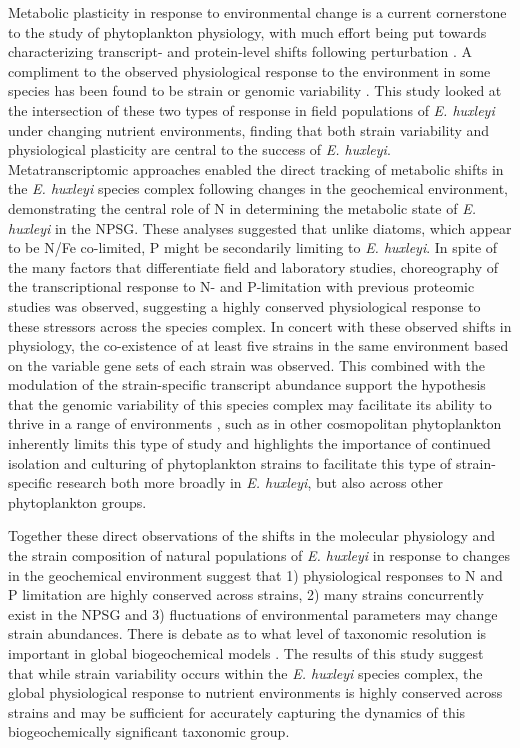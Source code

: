 Metabolic plasticity in response to environmental change is a current cornerstone to the study of phytoplankton physiology, with much effort being put towards characterizing transcript- and protein-level shifts following perturbation \citep{Dyhrman2006, Dyhrman2012, Wurch2011, Bertrand2012a, Jones2013, Bender2014, Frischkorn2014}. A compliment to the observed physiological response to the environment in some species has been found to be strain or genomic variability \citep{Kashtan2014}. This study looked at the intersection of these two types of response in field populations of \textit{E. huxleyi} under changing nutrient environments, finding that both strain variability and physiological plasticity are central to the success of \textit{E. huxleyi}. Metatranscriptomic approaches enabled the direct tracking of metabolic shifts in the \textit{E. huxleyi} species complex following changes in the geochemical environment, demonstrating the central role of N in determining the metabolic state of \textit{E. huxleyi} in the NPSG. These analyses suggested that unlike diatoms, which appear to be N/Fe co-limited, P might be secondarily limiting to \textit{E. huxleyi}. In spite of the many factors that differentiate field and laboratory studies, choreography of the transcriptional response to N- and P-limitation with previous proteomic studies \citep{McKew2015} was observed, suggesting a highly conserved physiological response to these stressors across the species complex. In concert with these observed shifts in physiology, the co-existence of at least five strains in the same environment based on the variable gene sets of each strain was observed. This combined with the modulation of the strain-specific transcript abundance support the hypothesis that the genomic variability of this species complex may facilitate its ability to thrive in a range of environments \citep{Read2013}, such as in other cosmopolitan phytoplankton \citep{Derelle2006, Johnson2006b} inherently limits this type of study and highlights the importance of continued isolation and culturing of phytoplankton strains to facilitate this type of strain-specific research both more broadly in \textit{E. huxleyi}, but also across other phytoplankton groups. \par
Together these direct observations of the shifts in the molecular physiology and the strain composition of natural populations of \textit{E. huxleyi} in response to changes in the geochemical environment suggest that 1) physiological responses to N and P limitation are highly conserved across strains, 2) many strains concurrently exist in the NPSG and 3) fluctuations of environmental parameters may change strain abundances. There is debate as to what level of taxonomic resolution is important in global biogeochemical models \citep{Follows2011}. The results of this study suggest that while strain variability occurs within the \textit{E. huxleyi} species complex, the global physiological response to nutrient environments is highly conserved across strains and may be sufficient for accurately capturing the dynamics of this biogeochemically significant taxonomic group.

